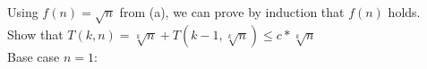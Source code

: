 \documentclass{article}
\begin{document}
\begin{enumerate}
Using $f(n) = \sqrt{n}$ from (a), we can prove by induction that $f(n)$ holds. \\
\newline 
Show that $T(k, n) = \sqrt[k]{n} + T(k-1, \sqrt[k]{n}) \leq c * \sqrt[k]{n}$ \\
Base case $n=1$:

\end{enumerate}
\end{document}
